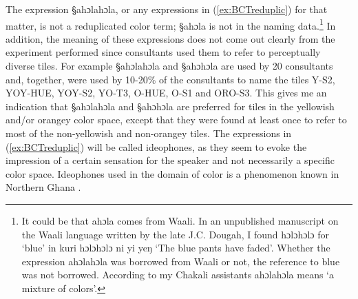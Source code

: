  The expression {\S ahɔlahɔla}, or  any expressions in (\ref{ex:BCTreduplic}) 
for that matter, is not a
reduplicated color term;   {\S ahɔla} is not in the naming
data.\footnote{It could be that {\F ahɔla} comes from Waali. In an unpublished
manuscript on the
Waali language written by the late J.C. Dougah, I found {\F hɔlɔhɔlɔ}  for 
`blue'   in {\F kuri hɔlɔhɔlɔ ni yi yeŋ} `The blue pants have faded'. Whether
the
expression {\F ahɔlahɔla} was borrowed from Waali or not, the reference to blue
was not borrowed. According to my Chakali assistants {\F ahɔlahɔla} means `a
mixture of colors'.} In addition,  the meaning of these expressions does not
come
out clearly from the experiment performed since  consultants used them to
refer to perceptually diverse tiles. For example {\S ahɔlahɔla} and {\S ahɔhɔla}
 are used by 20  consultants and, together, were used by 10-20\% of the
consultants to name the tiles Y-S2, YOY-HUE, YOY-S2, YO-T3, O-HUE, O-S1 and
ORO-S3.  This gives me an indication that {\S ahɔlahɔla} and {\S ahɔhɔla} are
preferred for tiles in the yellowish and/or orangey color space, except that
they were found at least once to refer to most of the non-yellowish and
non-orangey tiles.  The expressions in (\ref{ex:BCTreduplic}) will be called
ideophones, as they seem to evoke the  impression of a certain sensation for the
speaker and not necessarily a specific color space. Ideophones used in the
domain of color is a  phenomenon known in Northern Ghana \citep{Nade05}. 





